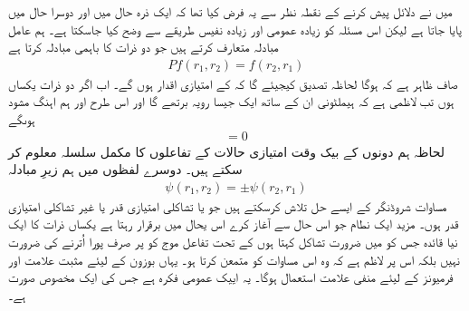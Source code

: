 میں نے دلائل پیش کرنے کے نقطہ نظر سے یہ فرض کیا تھا کہ ایک ذرہ حال  میں اور دوسرا حال  میں پایا جاتا ہے لیکن اس مسئلہ کو زیادہ عمومی اور زیادہ نفیس طریقے سے وضح کیا جاسکتا ہے۔ ہم عامل مبادلہ  متعارف کرتے ہیں جو دو ذرات کا باہمی مبادلہ کرتا ہے
\begin{align}
	Pf(r_1, r_2)=f(r_2, r_1)
\end{align}
صاف ظاہر ہے کہ  ہوگا لحاظہ تصدیق کیجیئے گا کہ  کے امتیازی اقدار  ہوں گے۔ اب اگر دو ذرات یکساں ہوں تب لاظمی ہے کہ ہیملٹونی ان کے ساتھ ایک جیسا رویہ برتھے گا  اور  اس طرح  اور  ہم اہنگ مشود ہوںگے
\begin{align}
	[P, H]=0
\end{align}
لحاظہ ہم دونوں کے بیک وقت امتیازی حالات کے تفاعلوں کا مکمل سلسلہ معلوم کر سکتے ہیں۔ دوسرے لفظوں میں ہم زیرِ مبادلہ 
\begin{align}
	\psi(r_1, r_2)=\pm\psi(r_2, r_1)
\end{align}
مساوات شروڈنگر کے ایسے حل تلاش کرسکتے ہیں جو یا تشاکلی امتیازی قدر  یا غیر تشاکلی امتیازی قدر  ہوں۔ مزید ایک نطام جو اس حال سے آغاز کرے اس یحال میں برقرار رہتا ہے یکساں ذرات کا ایک نیا قائدہ جس کو میں ضرورت تشاکل کہتا ہوں کے تحت تفاعل موج کو  پر صرف پورا اُترنے کی ضرورت نہیں بلکہ اس پر لاظم ہے کہ وہ اس مساوات کو متمعن کرتا ہو۔ یہاں بوزون کے لیئے مثبت علامت اور فرمیونز کے لیئے منفی علامت استعمال ہوگا۔ یہ اییک عمومی فکرہ ہے جس کی  ایک مخصوص صورت ہے۔

